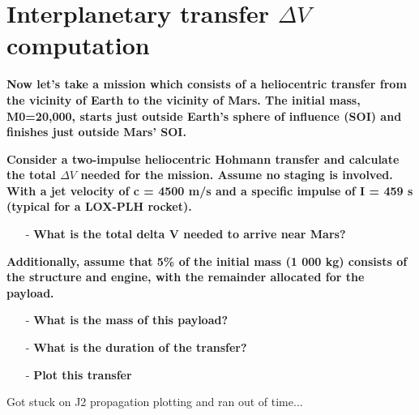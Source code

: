 \section{Interplanetary transfer $\Delta V$ computation}
\label{sec:interplanetary_transfer}

\textbf{Now let’s take a mission which consists of a heliocentric transfer from the vicinity of Earth to the vicinity of Mars. 
The initial mass, M0=20,000, starts just outside Earth’s sphere of influence (SOI) and finishes just outside Mars’ SOI.
}

\textbf{Consider a two-impulse heliocentric Hohmann transfer and calculate the total $\Delta V$ needed for the mission. 
Assume no staging is involved. 
With a jet velocity of c = 4500 m/s and a specific impulse of I = 459 s (typical for a LOX-PLH rocket).}
\begin{itemize}
    \item[-] \textbf{What is the total delta V needed to arrive near Mars?}
\end{itemize}


\textbf{Additionally, assume that 5\% of the initial mass (1 000 kg) consists of the structure and engine, with the remainder allocated for the payload.}
\begin{itemize}
    \item[-] \textbf{What is the mass of this payload?}
    \item[-] \textbf{What is the duration of the transfer?}
    \item[-] \textbf{Plot this transfer} 
\end{itemize}




Got stuck on J2 propagation plotting and ran out of time...
